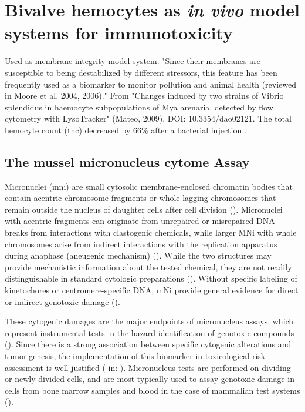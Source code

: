 \section{Bivalve hemocytes as \emph{in vivo} model systems for immunotoxicity}
Used as membrane integrity model system. "Since their membranes are susceptible to being destabilized by different stressors, this feature has been frequently used as a biomarker to monitor pollution and animal health (reviewed in Moore et al. 2004, 2006)." From "Changes induced by two strains of Vibrio splendidus in haemocyte subpopulations of Mya arenaria, detected by flow cytometry with LysoTracker" (Mateo, 2009), DOI: 10.3354/dao02121. The total hemocyte count (\acrshort{thc}) decreased by 66\% after a bacterial injection \cite{Parisi2008}.

\subsection{The mussel micronucleus cytome Assay}
Micronuclei (\acrshort{mni}) are small cytosolic membrane-enclosed chromatin bodies that contain acentric chromosome fragments or whole lagging chromosomes that remain outside the nucleus of daughter cells after cell division (\cite{Fenech2011}). Micronuclei with acentric fragments can originate from unrepaired or misrepaired DNA-breaks from interactions with clastogenic chemicals, while larger MNi with whole chromosomes arise from indirect interactions with the replication apparatus during anaphase (aneugenic mechanism) (\cite{Fenech2011}). While the two structures may provide mechanistic information about the tested chemical, they are not readily distinguishable in standard cytologic preparations (\cite{Natarajan1993}). Without specific labeling of kinetochores or centromere-specific DNA, mNi provide general evidence for direct or indirect genotoxic damage (\cite{Tucker1996, Lynch1993}).

These cytogenic damages are the major endpoints of micronucleus assays, which represent instrumental tests in the hazard identification of genotoxic compounds (\cite{OECD474, OECD487}). Since there is a strong association between specific cytogenic alterations and tumorigenesis, the implementation of this biomarker in toxicological risk assessment is well justified (\cite{Mitelman1983} in: \cite{Tucker1996}). Micronucleus tests are performed on dividing or newly divided cells, and are most typically used to assay genotoxic damage in cells from bone marrow samples and blood in the case of mammalian test systems (\cite{Heddle1983, Warheit2018b}).

